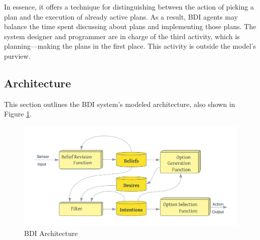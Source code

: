 In essence, it offers a technique for distinguishing between the action of picking a plan and the execution of already active plans. As a result, \ac{BDI} agents may balance the time spent discussing about plans and implementing those plans. The system designer and programmer are in charge of the third activity, which is planning—making the plans in the first place. This activity is outside the model's purview.

\subsection{Architecture}

This section outlines the \ac{BDI} system's modeled architecture, also shown in Figure \ref{BDI Architecture}.

    \begin{figure}[h]
    \centering
      \includegraphics[width=12cm]{includes/figures/BDI_arch.png}
      \caption{\ac{BDI} Architecture}
      \label{BDI Architecture}
    \end{figure}
    
